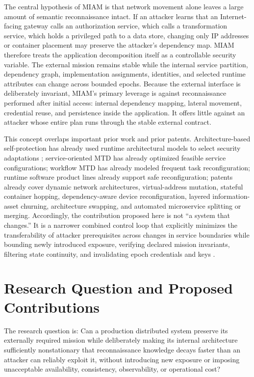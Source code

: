 \documentclass[11pt,letterpaper]{article}
\begin{document}
The central hypothesis of MIAM is that network movement alone leaves a large amount of semantic reconnaissance intact. If an attacker learns that an Internet-facing gateway calls an authorization service, which calls a transformation service, which holds a privileged path to a data store, changing only IP addresses or container placement may preserve the attacker's dependency map. MIAM therefore treats the application decomposition itself as a controllable security variable. The external mission remains stable while the internal service partition, dependency graph, implementation assignments, identities, and selected runtime attributes can change across bounded epochs. Because the external interface is deliberately invariant, MIAM's primary leverage is against reconnaissance performed after initial access: internal dependency mapping, lateral movement, credential reuse, and persistence inside the application. It offers little against an attacker whose entire plan runs through the stable external contract.

This concept overlaps important prior work and prior patents. Architecture-based self-protection has already used runtime architectural models to select security adaptations \cite{yuan2013}; service-oriented MTD has already optimized feasible service configurations; workflow MTD has already modeled frequent task reconfiguration; runtime software product lines already support safe reconfiguration; patents already cover dynamic network architectures, virtual-address mutation, stateful container hopping, dependency-aware device reconfiguration, layered information-asset churning, architecture swapping, and automated microservice splitting or merging. Accordingly, the contribution proposed here is not ``a system that changes.'' It is a narrower combined control loop that explicitly minimizes the transferability of attacker prerequisites across changes in service boundaries while bounding newly introduced exposure, verifying declared mission invariants, filtering state continuity, and invalidating epoch credentials and keys \cite{damiani2012,alhozaimy2024,ergenc2023}.

\section{Research Question and Proposed Contributions}

The research question is: Can a production distributed system preserve its externally required mission while deliberately making its internal architecture sufficiently nonstationary that reconnaissance knowledge decays faster than an attacker can reliably exploit it, without introducing new exposure or imposing unacceptable availability, consistency, observability, or operational cost?
\end{document}
